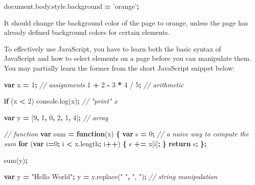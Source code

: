 \documentclass[12pt,]{krantz}
\makeatletter
\newenvironment{Shaded}{\begin{snugshade}}{\end{snugshade}}
\newcommand{\AttributeTok}[1]{\textcolor[rgb]{0.77,0.63,0.00}{#1}}
\newcommand{\CommentTok}[1]{\textcolor[rgb]{0.56,0.35,0.01}{\textit{#1}}}
\newcommand{\ControlFlowTok}[1]{\textcolor[rgb]{0.13,0.29,0.53}{\textbf{#1}}}
\newcommand{\DecValTok}[1]{\textcolor[rgb]{0.00,0.00,0.81}{#1}}
\newcommand{\KeywordTok}[1]{\textcolor[rgb]{0.13,0.29,0.53}{\textbf{#1}}}
\newcommand{\NormalTok}[1]{#1}
\newcommand{\OperatorTok}[1]{\textcolor[rgb]{0.81,0.36,0.00}{\textbf{#1}}}
\newcommand{\StringTok}[1]{\textcolor[rgb]{0.31,0.60,0.02}{#1}}
\newcommand{\VariableTok}[1]{\textcolor[rgb]{0.00,0.00,0.00}{#1}}
\newenvironment{kframe}{%
\medskip{}
\setlength{\fboxsep}{.8em}
 \def\at@end@of@kframe{}%
 \ifinner\ifhmode%
  \def\at@end@of@kframe{\end{minipage}}%
  \begin{minipage}{\columnwidth}%
 \fi\fi%
 \def\FrameCommand##1{\hskip\@totalleftmargin \hskip-\fboxsep
 \colorbox{shadecolor}{##1}\hskip-\fboxsep
     \hskip-\linewidth \hskip-\@totalleftmargin \hskip\columnwidth}%
 \MakeFramed {\advance\hsize-\width
   \@totalleftmargin\z@ \linewidth\hsize
   \@setminipage}}%
 {\par\unskip\endMakeFramed%
 \at@end@of@kframe}
\renewenvironment{Shaded}{\begin{kframe}}{\end{kframe}}
\theoremstyle{definition}
\theoremstyle{definition}
\theoremstyle{definition}
\theoremstyle{remark}
\makeatother
\begin{document}
\begin{Shaded}
\begin{Highlighting}[]
\VariableTok{document}\NormalTok{.}\VariableTok{body}\NormalTok{.}\VariableTok{style}\NormalTok{.}\AttributeTok{background} \OperatorTok{=} \StringTok{'orange'}\OperatorTok{;}
\end{Highlighting}
\end{Shaded}

It should change the background color of the page to orange, unless the
page has already defined background colors for certain elements.

To effectively use JavaScript, you have to learn both the basic syntax
of JavaScript and how to select elements on a page before you can
manipulate them. You may partially learn the former from the short
JavaScript snippet below:

\begin{Shaded}
\begin{Highlighting}[]
\KeywordTok{var}\NormalTok{ x }\OperatorTok{=} \DecValTok{1}\OperatorTok{;}  \CommentTok{// assignments}
\DecValTok{1} \OperatorTok{+} \DecValTok{2} \OperatorTok{-} \DecValTok{3} \OperatorTok{*} \DecValTok{4}\NormalTok{ / }\DecValTok{5}\OperatorTok{;}  \CommentTok{// arithmetic}

\ControlFlowTok{if}\NormalTok{ (x }\OperatorTok{<} \DecValTok{2}\NormalTok{) }\VariableTok{console}\NormalTok{.}\AttributeTok{log}\NormalTok{(x)}\OperatorTok{;}  \CommentTok{// "print" x}

\KeywordTok{var}\NormalTok{ y }\OperatorTok{=}\NormalTok{ [}\DecValTok{9}\OperatorTok{,} \DecValTok{1}\OperatorTok{,} \DecValTok{0}\OperatorTok{,} \DecValTok{2}\OperatorTok{,} \DecValTok{1}\OperatorTok{,} \DecValTok{4}\NormalTok{]}\OperatorTok{;}  \CommentTok{// array}

\CommentTok{// function}
\KeywordTok{var}\NormalTok{ sum }\OperatorTok{=} \KeywordTok{function}\NormalTok{(x) }\OperatorTok{\{}
  \KeywordTok{var}\NormalTok{ s }\OperatorTok{=} \DecValTok{0}\OperatorTok{;}
  \CommentTok{// a naive way to compute the sum}
  \ControlFlowTok{for}\NormalTok{ (}\KeywordTok{var}\NormalTok{ i}\OperatorTok{=}\DecValTok{0}\OperatorTok{;}\NormalTok{ i }\OperatorTok{<} \VariableTok{x}\NormalTok{.}\AttributeTok{length}\OperatorTok{;}\NormalTok{ i}\OperatorTok{++}\NormalTok{) }\OperatorTok{\{}
\NormalTok{    s }\OperatorTok{+=}\NormalTok{ x[i]}\OperatorTok{;}
  \OperatorTok{\}}
  \ControlFlowTok{return}\NormalTok{ s}\OperatorTok{;}
\OperatorTok{\};}

\AttributeTok{sum}\NormalTok{(y)}\OperatorTok{;}

\KeywordTok{var}\NormalTok{ y }\OperatorTok{=} \StringTok{"Hello World"}\OperatorTok{;}
\NormalTok{y }\OperatorTok{=} \VariableTok{y}\NormalTok{.}\AttributeTok{replace}\NormalTok{(}\StringTok{" "}\OperatorTok{,} \StringTok{", "}\NormalTok{)}\OperatorTok{;}  \CommentTok{// string manipulation}
\end{Highlighting}
\end{Shaded}
\end{document}
